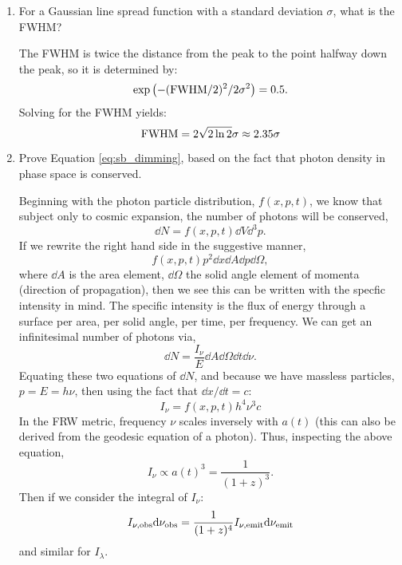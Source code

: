 \begin{enumerate}
\item For a Gaussian line spread function with a standard deviation
  $\sigma$, what is the FWHM?

\begin{answer}
The FWHM is twice the distance from the peak to the point halfway down
the peak, so it is determined by:
\begin{equation}
\exp\left(- ({\rm FWHM} / 2)^2 / 2 \sigma^2\right) = 0.5.
\end{equation}
Solving for the FWHM yields: 
\begin{equation}
{\rm FWHM} = 2 \sqrt{2\ln 2} \sigma \approx 2.35 \sigma
\end{equation}
\end{answer}
\item Prove Equation \ref{eq:sb_dimming}, based on the fact that
  photon density in phase space is conserved.

\begin{answer}
Beginning with the photon particle distribution, $f(x,p,t)$, we know
that subject only to cosmic expansion, the number of photons will be
conserved,
\begin{equation}
\dd N =f(x,p,t)\dd V \dd^3 p.
\end{equation}
If we rewrite the right hand side in the suggestive manner,
\begin{equation}
f(x,p,t)p^2\dd x \dd A \dd p \dd \Omega,
\end{equation}
where $\dd A$ is the area element, $\dd \Omega$ the solid angle
element of momenta (direction of propagation), then we see this can be
written with the specfic intensity in mind. The specific intensity is
the flux of energy through a surface per area, per solid angle, per
time, per frequency. We can get an infinitesimal number of photons
via,
\begin{equation}
 \dd N =\frac{I_\nu}{E} \dd A \dd \Omega  \dd t \dd \nu.
\end{equation}
Equating these two equations of $\dd N$, and because we have massless
particles, $p=E=h\nu$, then using the fact that $\dd x / \dd t = c$:
\begin{equation}
    I_\nu=f(x,p,t)h^{4} \nu^3 c
\end{equation}
In the FRW metric, frequency $\nu$ scales inversely with $a(t)$ (this
can also be derived from the geodesic equation of a photon). Thus,
inspecting the above equation,
\begin{equation}
    I_\nu\propto a(t)^{3} = \frac{1}{(1+z)^3}.
\end{equation}
Then if we consider the integral of $I_\nu$:
\begin{equation}
    I_{\nu, \rm obs} {\rm d}\nu_{\rm obs}  =
    \frac{1}{(1+z)^4} I_{\nu, \rm emit} {\rm d}\nu_{\rm emit}
\end{equation}
and similar for $I_\lambda$.
\end{answer}


\end{enumerate}
